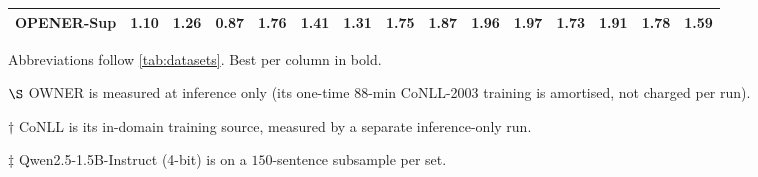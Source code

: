 \begin{table}[tp]
\begin{adjustbox}{max width=\textwidth}
\begin{threeparttable}
\begin{tabular}{l*{13}{c}c}
\rowcolor{hlred} OPENER-Sup & 1.10 & 1.26 & 0.87 & 1.76 & 1.41 & 1.31 & 1.75 & 1.87 & 1.96 & 1.97 & 1.73 & 1.91 & 1.78 & 1.59 \\
\bottomrule
\end{tabular}
\begin{tablenotes}[flushleft]
\footnotesize
\item Abbreviations follow \autoref{tab:datasets}. Best per column in bold.
\item[$\S$] OWNER is measured at inference only (its one-time $88$-min CoNLL-2003 training is amortised, not charged per run).
\item[$\dagger$] CoNLL is its in-domain training source, measured by a separate inference-only run.
\item[$\ddagger$] Qwen2.5-1.5B-Instruct (4-bit) is on a $150$-sentence subsample per set.
\end{tablenotes}
\end{threeparttable}
\end{adjustbox}
\end{table}
